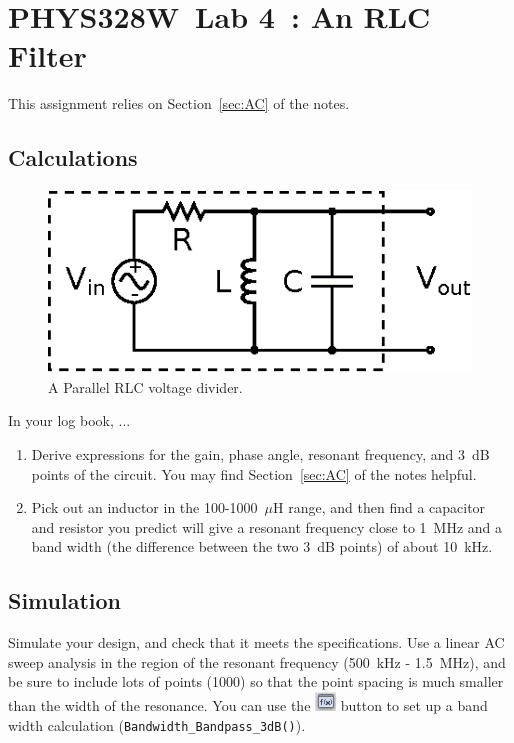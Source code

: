 \documentclass[11pt]{article}
\newcommand{\COURSE}{PHYS328W}
\newcommand{\LABNUM}{4}
\newcommand{\TITLE}{An RLC Filter}
\begin{document}
\thispagestyle{empty}

\section*{\COURSE\ Lab \LABNUM\ : \TITLE}

This assignment relies on Section~\ref{sec:AC} of the notes.

\subsection*{Calculations}

\begin{figure}[h]
\centering
\includegraphics{rlcparallel.eps}
\caption{A Parallel RLC voltage divider.}
\label{fig:rlcparallel}
\end{figure}

In your log book, ...

\begin{enumerate}
\item Derive expressions for the gain, phase angle, resonant
  frequency, and 3~dB points of the circuit. You may find
  Section~\ref{sec:AC} of the notes helpful.

\item Pick out an inductor in the 100-1000~$\mu$H range, and then find
  a capacitor and resistor you predict will give a resonant frequency
  close to 1~MHz and a band width (the difference between the two 3~dB
  points) of about 10~kHz.
\end{enumerate}

\subsection*{Simulation}

Simulate your design, and check that it meets the specifications. Use
a linear AC sweep analysis in the region of the resonant frequency
(500~kHz - 1.5~MHz), and be sure to include lots of points (1000) so
that the point spacing is much smaller than the width of the resonance. 
You can use the \includegraphics{PSpiceAD_DefineMeasurement.png} button to
set up a band width calculation (\verb+Bandwidth_Bandpass_3dB()+).
\end{document}
